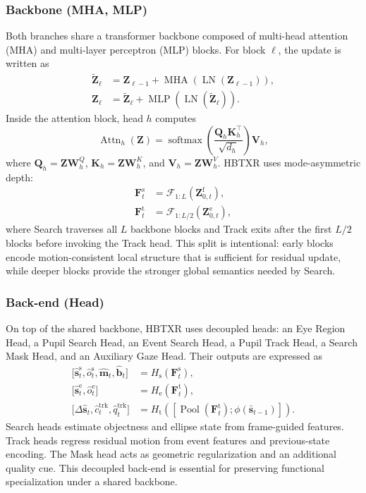 \documentclass[journal]{IEEEtran}
\begin{document}
\subsubsection{Backbone (MHA, MLP)}
Both branches share a transformer backbone composed of multi-head attention (MHA) and multi-layer perceptron (MLP) blocks. For block $\ell$, the update is written as
\begin{align}
\tilde{\mathbf Z}_{\ell} &= \mathbf Z_{\ell-1} + \operatorname{MHA}\!\left(\operatorname{LN}(\mathbf Z_{\ell-1})\right),
\\
\mathbf Z_{\ell} &= \tilde{\mathbf Z}_{\ell} + \operatorname{MLP}\!\left(\operatorname{LN}(\tilde{\mathbf Z}_{\ell})\right).
\end{align}
Inside the attention block, head $h$ computes
\begin{equation}
\operatorname{Attn}_h(\mathbf Z)=
\operatorname{softmax}\!\left(
\frac{\mathbf Q_h\mathbf K_h^{\top}}{\sqrt{d_h}}
\right)\mathbf V_h,
\end{equation}
where $\mathbf Q_h=\mathbf Z\mathbf W_h^Q$, $\mathbf K_h=\mathbf Z\mathbf W_h^K$, and $\mathbf V_h=\mathbf Z\mathbf W_h^V$. HBTXR uses mode-asymmetric depth:
\begin{align}
\mathbf F_t^{\mathrm{s}} &= \mathcal F_{1:L}\!\left(\mathbf Z_{0,t}^{\mathrm{f}}\right),
\\
\mathbf F_t^{\mathrm{t}} &= \mathcal F_{1:L/2}\!\left(\mathbf Z_{0,t}^{\mathrm{e}}\right),
\end{align}
where Search traverses all $L$ backbone blocks and Track exits after the first $L/2$ blocks before invoking the Track head. This split is intentional: early blocks encode motion-consistent local structure that is sufficient for residual update, while deeper blocks provide the stronger global semantics needed by Search.

\subsubsection{Back-end (Head)}
On top of the shared backbone, HBTXR uses decoupled heads: an Eye Region Head, a Pupil Search Head, an Event Search Head, a Pupil Track Head, a Search Mask Head, and an Auxiliary Gaze Head. Their outputs are expressed as
\begin{align}
\big[\hat{\mathbf s}_t^{\mathrm{s}},\hat o_t^{\mathrm{s}},\hat{\mathbf m}_t,\hat{\mathbf b}_t\big]
&= H_{\mathrm{s}}\!\left(\mathbf F_t^{\mathrm{s}}\right),
\\
\big[\hat{\mathbf s}_t^{\mathrm{e}},\hat o_t^{\mathrm{e}}\big]
&= H_{\mathrm{e}}\!\left(\mathbf F_t^{\mathrm{t}}\right),
\\
\big[\Delta\hat{\mathbf s}_t,\hat c_t^{\mathrm{trk}},\hat q_t^{\mathrm{trk}}\big]
&= H_{\mathrm{t}}\!\left([\operatorname{Pool}(\mathbf F_t^{\mathrm{t}});\phi(\bar{\mathbf s}_{t-1})]\right).
\end{align}
Search heads estimate objectness and ellipse state from frame-guided features. Track heads regress residual motion from event features and previous-state encoding. The Mask head acts as geometric regularization and an additional quality cue. This decoupled back-end is essential for preserving functional specialization under a shared backbone.
\end{document}

